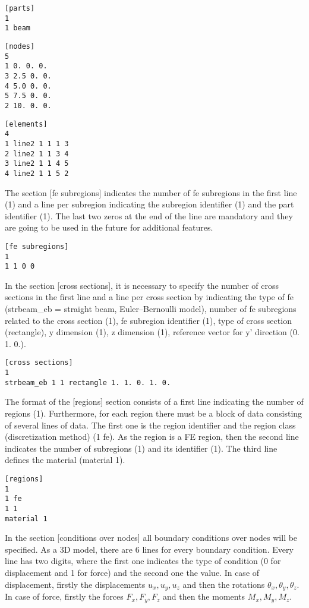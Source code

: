 \documentclass[a4]{article}
\begin{document}
\begin{Verbatim}	
[parts]
1
1 beam
\end{Verbatim}

\begin{Verbatim}	
[nodes]
5
1 0. 0. 0.
3 2.5 0. 0.
4 5.0 0. 0.
5 7.5 0. 0.
2 10. 0. 0.
\end{Verbatim}

\begin{Verbatim}	
[elements]
4
1 line2 1 1 1 3
2 line2 1 1 3 4
3 line2 1 1 4 5
4 line2 1 1 5 2
\end{Verbatim}

The section [fe subregions] indicates the number of fe subregions in the first line (1) and a line per subregion indicating the subregion identifier (1) and the part identifier (1). The last two zeros at the end of the line are mandatory and they are going to be used in the
future for additional features.

\begin{Verbatim}
[fe subregions]
1
1 1 0 0
\end{Verbatim}

In the section [cross sections], it is necessary to specify the number of cross sections in the first line and a line per cross section by indicating the type of fe (strbeam\_eb = straight beam, Euler–Bernoulli model), number of fe subregions related to the cross section (1), fe subregion identifier (1), type of cross section (rectangle), y dimension (1), z dimension (1), reference vector for y' direction (0. 1. 0.).

\begin{Verbatim}
[cross sections]
1
strbeam_eb 1 1 rectangle 1. 1. 0. 1. 0.
\end{Verbatim}

The format of the [regions] section consists of a first line indicating the number of regions (1). Furthermore, for each region there must be a block of data consisting of several lines of data. The first one is the region identifier and the region class (discretization method) (1 fe). As the region is a FE region, then the second line indicates the number of subregions (1) and its identifier (1). The third line defines the material (material 1). 

\begin{Verbatim}	
[regions]
1
1 fe
1 1
material 1
\end{Verbatim}

In the section [conditions over nodes] all boundary conditions over nodes will be specified. As a 3D model, there are 6 lines for every boundary condition. Every line has two digits, where the first one indicates the type of condition (0 for displacement and 1 for force) and the second one the value. In case of displacement, firstly the displacements $u_x, u_y, u_z$ and then the rotations $\theta_x, \theta_y, \theta_z$. In case of force, firstly the forces $F_x, F_y, F_z$ and then the moments $M_x, M_y, M_z$. 
\end{document}

